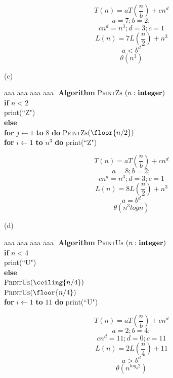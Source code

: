 \begin{problem}
\begin{solution}
\[ T(n) = aT( \frac{n}{b} ) + cn^{d} \]
\[ a = 7; b = 2; \]
\[ cn^{d} = n^{3}; d = 3; c = 1 \]
\[ L(n) = 7L( \frac{n}{2} ) + n^{3} \]
\[ a < b^{d} \]
\[ \theta(n^{3}) \]
\end{solution}


\bigskip
\noindent
(c)\ \ 
\begin{minipage}[t]{3in}
\begin{tabbing}
aaa \= aaa \= aaa \= aaa \=  \kill
\textbf{Algorithm} \textsc{PrintZs} $(n: \mbox{\bf integer})$ \\
          \> \textbf{if} $n < 2$ \\
          \>\>  print(``Z") \\
          \>\textbf{else} \\
          \>\>  \textbf{for} $j \leftarrow 1$ \textbf{to} $8$ 
					\textbf{do} \textsc{PrintZs}$(\floor{n/2})$\\
      \>\> \textbf{for} $i \leftarrow 1$ \textbf{to} $n^3$ \textbf{do} print(``Z")
\end{tabbing}
\end{minipage}

\begin{solution}
\[ T(n) = aT( \frac{n}{b} ) + cn^{d} \]
\[ a = 8; b = 2; \]
\[ cn^{d} = n^{3}; d = 3; c = 1 \]
\[ L(n) = 8L( \frac{n}{2} ) + n^{3} \]
\[ a = b^{d} \]
\[ \theta(n^{3} log n ) \]
\end{solution}

\bigskip
\noindent
(d)\ \ 
\begin{minipage}[t]{3in}
\begin{tabbing}
aaa \= aaa \= aaa \= aaa \=  \kill
\textbf{Algorithm} \textsc{PrintUs} $(n: \mbox{\bf integer})$ \\
          \> \textbf{if} $n < 4$ \\
          \>\>  print(``U") \\
          \>\textbf{else} \\
          \>\>  \textsc{PrintUs}$(\ceiling{n/4})$\\
          \>\>  \textsc{PrintUs}$(\floor{n/4})$\\
      \>\> \textbf{for} $i \leftarrow 1$ \textbf{to} $11$ \textbf{do} print(``U")
\end{tabbing}
\end{minipage}

\begin{solution}
\[ T(n) = aT( \frac{n}{b} ) + cn^{d} \]
\[ a = 2; b = 4; \]
\[ cn^{d} = 11; d = 0; c = 11 \]
\[ L(n) = 2L( \frac{n}{4} ) + 11 \]
\[ a > b^{d} \]
\[ \theta(n^{log_{4}2}) \]
\end{solution}


\end{problem}
